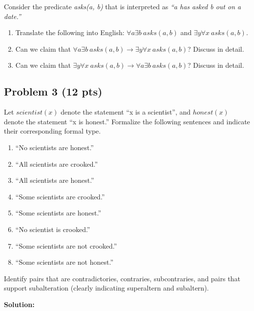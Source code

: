 \documentclass[12pt]{article}
\begin{document}
Consider the predicate \textit{asks(a, b)} that is interpreted as \textit{``a has asked b out on a date.''}
\begin{enumerate}
\item Translate the following into English: $\forall a \exists b~asks(a, b)$ and $\exists y \forall x ~asks(a, b)$.
\item Can we claim that $\forall a \exists b~asks(a, b) \rightarrow \exists y \forall x ~asks(a, b)$? Discuss in detail.
\item Can we claim that $\exists y \forall x ~asks(a, b) \rightarrow \forall a \exists b~asks(a, b)$? Discuss in detail.
\end{enumerate}


\newpage

\subsection{Problem 3 (12 pts)}

\noindent Let $scientist(x)$ denote the statement ``x is a scientist'', and $honest(x)$ denote the statement ``x is honest.'' Formalize the following sentences and indicate their corresponding formal type.

\begin{enumerate}
\item ``No scientists are honest.''

\item ``All scientists are crooked.''

\item ``All scientists are honest.''

\item ``Some scientists are crooked.''

\item ``Some scientists are honest.''

\item ``No scientist is crooked.''

\item ``Some scientists are not crooked.''

\item ``Some scientists are not honest.''

\end{enumerate}

\noindent Identify pairs that are contradictories, contraries, subcontraries, and pairs that support subalteration (clearly indicating superaltern and subaltern).

\bigskip
\noindent \textbf{Solution:}
\end{document}
